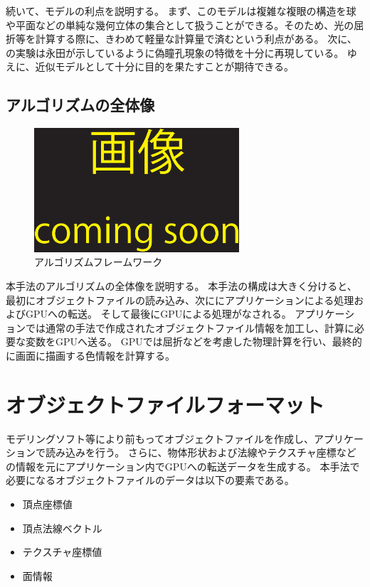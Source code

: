 続いて、モデルの利点を説明する。
まず、このモデルは複雑な複眼の構造を球や平面などの単純な幾何立体の集合として扱うことができる。そのため、光の屈折等を計算する際に、きわめて軽量な計算量で済むという利点がある。
次に、の実験は永田\cite{}が示しているように偽瞳孔現象の特徴を十分に再現している。
ゆえに、近似モデルとして十分に目的を果たすことが期待できる。


\subsection{アルゴリズムの全体像}
\label{SSAlgorithm}

\begin{figure}[h]
  \centering
  \includegraphics[width=3.0in]{./img/TEMP}
  \caption{アルゴリズムフレームワーク}
  \label{FAlgoframework}
\end{figure}

本手法のアルゴリズムの全体像を説明する。
本手法の構成は大きく分けると、最初にオブジェクトファイルの読み込み、次ににアプリケーションによる処理およびGPUへの転送。
そして最後にGPUによる処理がなされる。
アプリケーションでは通常の手法で作成されたオブジェクトファイル情報を加工し、計算に必要な変数をGPUへ送る。
GPUでは屈折などを考慮した物理計算を行い、最終的に画面に描画する色情報を計算する。


\section{オブジェクトファイルフォーマット}
\label{SObjfileformat}

モデリングソフト等により前もってオブジェクトファイルを作成し、アプリケーションで読み込みを行う。
さらに、物体形状および法線やテクスチャ座標などの情報を元にアプリケーション内でGPUへの転送データを生成する。
本手法で必要になるオブジェクトファイルのデータは以下の要素である。

\begin{itemize}
\item 頂点座標値
\item 頂点法線ベクトル
\item テクスチャ座標値
\item 面情報
\end{itemize}


